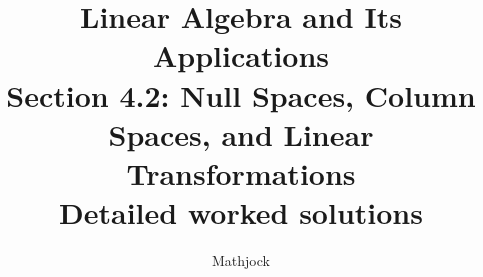 
\title{\textbf{Linear Algebra and Its Applications}\\[0.3em]Section 4.2: Null Spaces, Column Spaces, and Linear Transformations\\[0.3em]\large Detailed worked solutions}
\author{Mathjock}
\date{}

\maketitle
\bookinfo
\tableofcontents
\clearpage
\renewcommand{\thesection}{4.\arabic{section}}
\renewcommand{\theHsection}{4.\arabic{section}}
\setcounter{section}{1}


